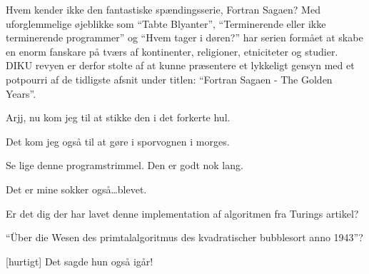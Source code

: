 \documentclass[a4paper,11pt]{article}
\begin{document}
  
\begin{sketch}


 Hvem kender ikke den fantastiske spændingsserie, Fortran
Sagaen? Med uforglemmelige øjeblikke som ``Tabte Blyanter'', ``Terminerende
eller ikke terminerende programmer'' og ``Hvem tager i døren?'' har
serien formået at skabe en enorm fanskare på tværs af kontinenter,
religioner, etniciteter og studier. DIKU revyen er derfor stolte af at
kunne præsentere et lykkeligt gensyn med et potpourri af de tidligste
afsnit under titlen: ``Fortran Sagaen - The Golden Years''.


 Arjj, nu kom jeg til
at stikke den i det forkerte hul.



 Det kom jeg også til at gøre i sporvognen i morges.

 Se lige denne programstrimmel.
 Den er godt nok lang.


 Det er mine sokker også\ldots  blevet.


 Er det dig der har lavet denne implementation af algoritmen fra
Turings artikel?

``Über die Wesen des primtalalgoritmus des kvadratischer bubblesort
  anno 1943''?

[hurtigt] Det sagde hun også igår!




\end{sketch}
\end{document}

